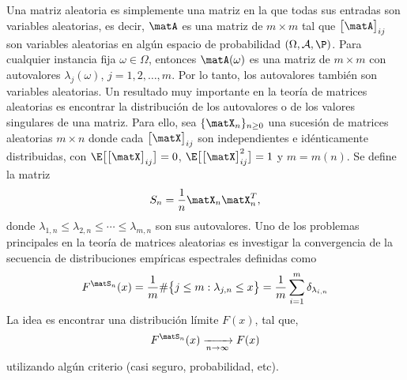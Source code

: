 Una matriz aleatoria es simplemente una matriz en la que todas sus entradas son variables aleatorias, es decir, $\matA$ es una matriz de $m\times m$ tal que $\big[\matA\big]_{ij}$ son variables aleatorias en algún espacio de probabilidad $(\Omega,\mathcal{A},\P)$. Para cualquier instancia fija $\omega\in\Omega$, entonces $\matA(\omega)$ es una matriz de $m\times m$ con autovalores $\lambda_j(\omega)$, $j=1,2,\ldots,m$. Por lo tanto, los autovalores también son variables aleatorias.
Un resultado muy importante en la teoría de matrices aleatorias es encontrar la distribución de los autovalores o de los valores singulares de una matriz. Para ello, sea $\{\matX_n\}_{n\ge 0}$ una sucesión de matrices aleatorias $m\times n$ donde cada $\big[\matX\big]_{ij}$ son independientes e idénticamente distribuidas, con $\E\big[\big[\matX\big]_{ij}\big]=0$, $\E\big[\big[\matX\big]_{ij}^2\big]=1$ y $m=m(n)$. Se define la matriz
\begin{equation}
    S_n = \frac{1}{n}\matX_n\matX_n^T,
    \label{Eq:covMP}
\end{equation}
donde $\lambda_{1,n}\le\lambda_{2,n}\le\cdots\le\lambda_{m,n}$ son sus autovalores. 
Uno de los problemas principales en la teoría de matrices aleatorias es investigar la convergencia de la secuencia de distribuciones empíricas espectrales definidas como 
\begin{equation}
    F^{\matS_n}(x) = \frac{1}{m}\#\big\{ j\leq m:\lambda_{j,n}\leq x\big\} = \frac{1}{m}\sum_{i=1}^m\delta_{\lambda_{i,n}}
    \label{Eq:Spectralmeasure}
\end{equation}
La idea es encontrar una distribución límite $F(x)$, tal que,
\begin{equation}
    F^{\matS_n}(x) \xrightarrow[n\to \infty]{} F(x)
    \label{Eq:Convergence}
\end{equation}
utilizando algún criterio (casi seguro, probabilidad, etc). 

